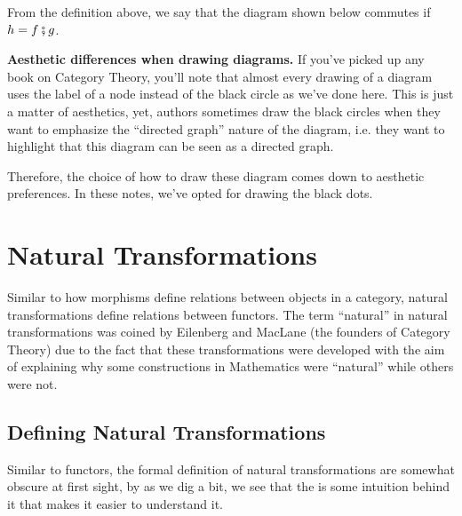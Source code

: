 From the definition above, we say that the diagram shown below commutes
if $h = f \fatsemi g$.

\begin{shaded}
  \textbf{Aesthetic differences when drawing diagrams.}
  If you've picked up any book on Category Theory, you'll note that almost every
  drawing of a diagram uses the label of a node instead of the black circle
  as we've done here. This is just a matter of aesthetics, yet, authors
  sometimes draw the black circles when they want to emphasize the
  ``directed graph'' nature of the diagram, i.e. they want to highlight
  that this diagram can be seen as a directed graph.

  Therefore, the choice of how to draw these diagram comes down to
  aesthetic preferences. In these notes, we've opted for drawing the
  black dots.
\end{shaded}


\section{Natural Transformations}

Similar to how morphisms define relations between objects in a category, natural transformations
define relations between functors.
The term ``natural'' in natural transformations was coined by Eilenberg and MacLane (the founders
of Category Theory) due to the fact that these transformations were developed with the
aim of explaining why some constructions in Mathematics were ``natural'' while others
were not.


\subsection{Defining Natural Transformations}

Similar to functors, the formal definition of natural transformations
are somewhat obscure at first sight, by as we dig a bit, we see that the is
some intuition behind it that makes it easier to understand it.

